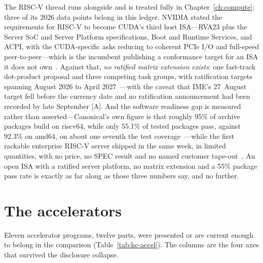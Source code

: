 The RISC-V thread runs alongside and is treated fully in Chapter~\ref{ch:compute}; three of its 2026 data points belong in this ledger. NVIDIA stated the requirements for RISC-V to become CUDA's third host ISA---RVA23 plus the Server SoC and Server Platform specifications, Boot and Runtime Services, and ACPI, with the CUDA-specific asks reducing to coherent PCIe I/O and full-speed peer-to-peer---which is the incumbent publishing a conformance target for an ISA it does not own~\cite{hc2026-nv-riscv}. Against that, \emph{no ratified matrix extension exists}: one fast-track dot-product proposal and three competing task groups, with ratification targets spanning August 2026 to April 2027~\cite{hc2026-riscv-profiles}---with the caveat that IME's 27~August target fell before the currency date and no ratification announcement had been recorded by late September [A]. And the software readiness gap is measured rather than asserted---Canonical's own figure is that roughly 95\% of archive packages build on riscv64, while only 55.1\% of tested packages pass, against 92.3\% on amd64, on about one seventh the test coverage~\cite{hc2026-canonical}---while the first rackable enterprise RISC-V server shipped in the same week, in limited quantities, with no price, no SPEC result and no named customer tape-out~\cite{sifive-bigsky}. An open ISA with a ratified server platform, no matrix extension and a 55\% package pass rate is exactly as far along as those three numbers say, and no further.

\section{The accelerators}

Eleven accelerator programs, twelve parts, were presented or are current enough to belong in the comparison (Table~\ref{tab:hc-accel}). The columns are the four axes that survived the disclosure collapse.

